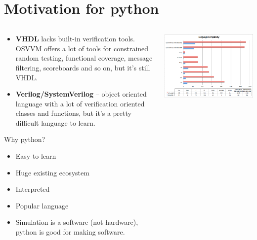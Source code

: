 \documentclass[aspectratio=169]{beamer}
\begin{document}
\section*{Motivation for python}
\begin{frame}{\secname}
  \begin{columns}
    \begin{column}{0.6\textwidth}
      \begin{itemize}
        \item {\bf VHDL} lacks built-in verification tools. 
          OSVVM offers a lot of tools for constrained random testing, 
          functional coverage, message filtering, scoreboards and so on, but it's still VHDL. 
        \item {\bf Verilog/SystemVerilog} -- object oriented language with a lot of verification oriented classes and functions, but it's a pretty difficult language to learn. 
      \end{itemize}
        

      \begin{block}{Why python?}
        \begin{itemize}
          \item Easy to learn
          \item Huge existing ecosystem
          \item Interpreted 
          \item Popular language
          \item Simulation is a software (not hardware), python is good for making software. 
        \end{itemize}
      \end{block}
    \end{column}

    \begin{column}{0.5\textwidth}
      \includegraphics[width=1.0\textwidth]{figs/lang_coplexity.png}
    \end{column}
  \end{columns}
  	
\end{frame}
\end{document}
